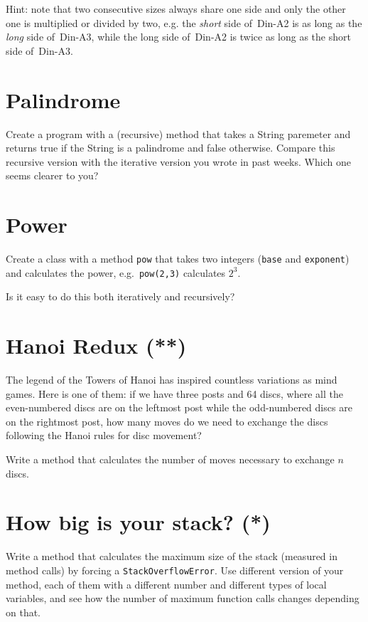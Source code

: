 \documentclass{article}
\begin{document}
Hint: note that two consecutive sizes always share one side and only
the other one is multiplied or divided by two, e.g. the \emph{short}
side of~Din-A2 is as long as the \emph{long} side of~Din-A3, while the
long side of~Din-A2 is twice as long as the short side of~Din-A3.

\section{Palindrome}
\label{sec:palindrome}

Create a program with a (recursive) method that takes a String
paremeter and
returns true if the String is a palindrome and false
otherwise. Compare this recursive version with the iterative version
you wrote in past weeks. Which one seems clearer to you?

\section{Power}
\label{sec:power}

Create a class with a method \verb+pow+ that takes two integers
(\verb+base+ and \verb+exponent+) and calculates the power, 
e.g.~\verb+pow(2,3)+ calculates $2^3$. 

Is it easy to do this both iteratively and recursively? 

\section{Hanoi Redux (**)}
\label{sec:hanoi-redux}

The legend of the Towers of Hanoi has inspired countless variations as
mind games. Here is one of them: if we have three posts and 64 discs,
where all the even-numbered discs are on the leftmost post while the
odd-numbered discs are on the rightmost post, how many moves do we
need to exchange the discs following the Hanoi rules for disc
movement? 

Write a method that calculates the number of moves necessary to
exchange $n$ discs. 

\section{How big is your stack? (*)}
\label{sec:how-big-your}

Write a method that calculates the maximum size of the stack (measured
in method calls) by forcing a \verb+StackOverflowError+. Use different
version of your method, each of them with a different number and
different types of local variables, and see
how the number of maximum function calls changes depending on that. 

\end{document}
